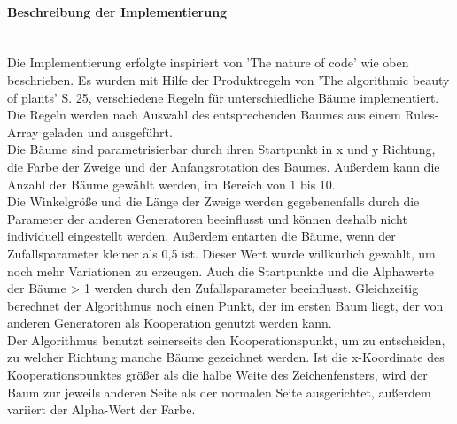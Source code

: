 \documentclass[../mciAusarbeitung.tex]{subfiles}
\begin{document}
		\paragraph{Beschreibung der Implementierung}$~$\\
		Die Implementierung erfolgte inspiriert von 'The nature of code' \cite{shiffman2012nature} wie oben beschrieben.
		Es wurden mit Hilfe der Produktregeln von 'The algorithmic beauty of plants'  \cite{prusinkiewicz2012algorithmic} S. 25, verschiedene Regeln für unterschiedliche Bäume implementiert.\\
		Die Regeln werden nach Auswahl des entsprechenden Baumes aus einem Rules-Array geladen und ausgeführt.\\
		Die Bäume sind parametrisierbar durch ihren Startpunkt in x und y Richtung, die Farbe der Zweige und der Anfangsrotation des Baumes. Außerdem kann die Anzahl der Bäume gewählt werden, im Bereich von 1 bis 10.\\
		Die Winkelgröße und die Länge der Zweige werden gegebenenfalls durch die Parameter der anderen Generatoren beeinflusst und können deshalb nicht individuell eingestellt werden. Außerdem entarten die Bäume, wenn der Zufallsparameter kleiner als 0,5 ist. Dieser Wert wurde willkürlich gewählt, um noch mehr Variationen zu erzeugen. Auch die Startpunkte und die Alphawerte der Bäume > 1 werden durch den Zufallsparameter beeinflusst. Gleichzeitig berechnet der Algorithmus noch einen Punkt, der im ersten Baum liegt, der von anderen Generatoren als Kooperation genutzt werden kann.\\
		Der Algorithmus benutzt seinerseits den Kooperationspunkt, um zu entscheiden, zu welcher Richtung manche Bäume gezeichnet werden. Ist die x-Koordinate des Kooperationspunktes größer als die halbe Weite des Zeichenfensters, wird der Baum zur jeweils anderen Seite als der normalen Seite ausgerichtet, außerdem variiert der Alpha-Wert der Farbe.\\
		
\end{document}
